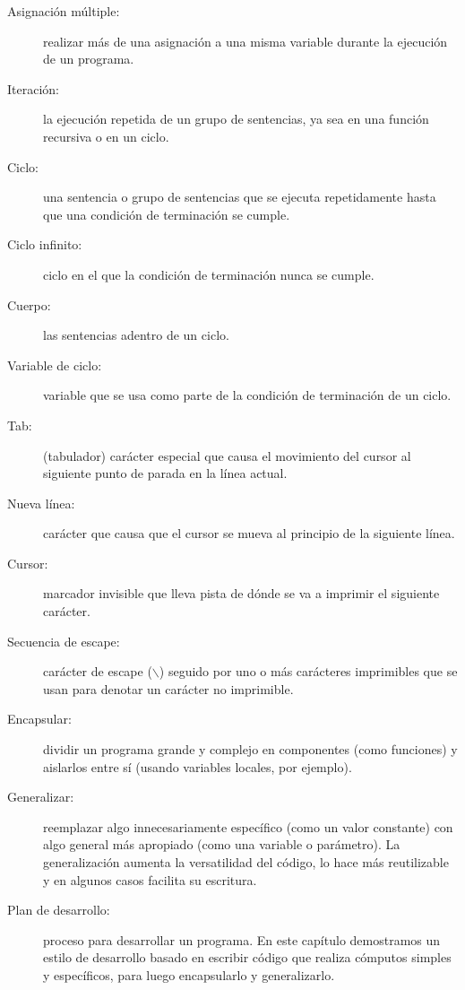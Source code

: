 \begin{description}

\item[Asignación múltiple:] realizar más de una asignación a una misma
variable durante la ejecución de un programa.

\item[Iteración:] la ejecución repetida de un grupo de sentencias, ya
sea en una función recursiva o en un ciclo.

\item[Ciclo:] una sentencia o grupo de sentencias que se ejecuta 
repetidamente hasta que una condición de terminación se cumple.

\item[Ciclo infinito:] ciclo en el que la condición de terminación 
nunca se cumple.

\item[Cuerpo:] las sentencias adentro de un ciclo.

\item[Variable de ciclo:] variable que se usa como parte de la 
condición de terminación de un ciclo.

\item[Tab:] (tabulador) carácter especial que causa el movimiento
del cursor al siguiente punto de parada en la línea actual.

\item[Nueva línea:] carácter que causa que el cursor se mueva al
principio de la siguiente línea.

\item[Cursor:] marcador invisible que lleva pista de dónde se va
a imprimir el siguiente carácter.

\item[Secuencia de escape:] carácter de escape ($\backslash$) seguido
por uno o más carácteres imprimibles que se usan para denotar un 
carácter no imprimible.

\item[Encapsular:] dividir un programa grande y complejo en componentes
(como funciones) y aislarlos entre sí (usando variables locales, por ejemplo).

\item[Generalizar:] reemplazar algo innecesariamente específico (como un 
valor constante) con algo general más apropiado (como una variable o parámetro).
La generalización aumenta la versatilidad del código, lo hace más 
reutilizable y en algunos casos facilita su escritura.

\item[Plan de desarrollo:] proceso para desarrollar un programa. En este
capítulo demostramos un estilo de desarrollo basado en escribir código
que realiza cómputos simples y  específicos, para luego encapsularlo y 
generalizarlo.


\end{description}


